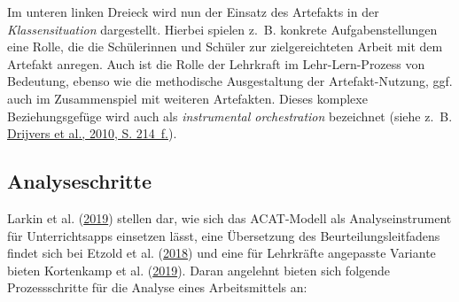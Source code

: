 \documentclass[
]{scrbook}
\theoremstyle{definition}
\theoremstyle{definition}
\theoremstyle{definition}
\theoremstyle{definition}
\theoremstyle{remark}
\begin{document}
Im unteren linken Dreieck wird nun der Einsatz des Artefakts in der \emph{Klassensituation} dargestellt. Hierbei spielen z.~B. konkrete Aufgabenstellungen eine Rolle, die die Schülerinnen und Schüler zur zielgereichteten Arbeit mit dem Artefakt anregen. Auch ist die Rolle der Lehrkraft im Lehr-Lern-Prozess von Bedeutung, ebenso wie die methodische Ausgestaltung der Artefakt-Nutzung, ggf. auch im Zusammenspiel mit weiteren Artefakten. Dieses komplexe Beziehungsgefüge wird auch als \emph{instrumental orchestration} bezeichnet (siehe z.~B. \protect\hyperlink{ref-Drijvers2010}{Drijvers et al., 2010, S. 214~f.}).

\hypertarget{analyseschritte}{%
\subsection{Analyseschritte}\label{analyseschritte}}

Larkin et al. (\protect\hyperlink{ref-Larkin2019}{2019}) stellen dar, wie sich das ACAT-Modell als Analyseinstrument für Unterrichtsapps einsetzen lässt, eine Übersetzung des Beurteilungsleitfadens findet sich bei Etzold et al. (\protect\hyperlink{ref-Etzold2018}{2018}) und eine für Lehrkräfte angepasste Variante bieten Kortenkamp et al. (\protect\hyperlink{ref-Kortenkamp2019}{2019}). Daran angelehnt bieten sich folgende Prozessschritte für die Analyse eines Arbeitsmittels an:
\end{document}
